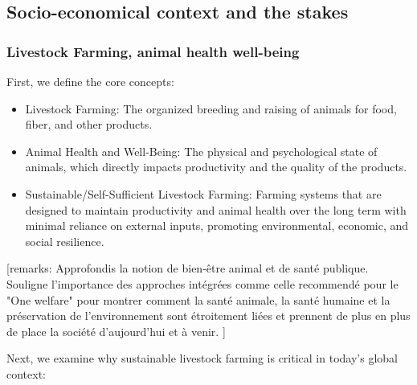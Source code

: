 \subsection{Socio-economical context and the stakes}




\subsubsection{Livestock Farming, animal health well-being}



First, we define the core concepts:
\begin{itemize}
    \item Livestock Farming: The organized breeding and raising of animals for food, fiber, and other products.
    \item Animal Health and Well-Being: The physical and psychological state of animals, which directly impacts productivity and the quality of the products.
    \item Sustainable/Self-Sufficient Livestock Farming: Farming systems that are designed to maintain productivity and animal health over the long term with minimal reliance on external inputs, promoting environmental, economic, and social resilience.
\end{itemize}

[remarks: Approfondis la notion de bien-être animal et de santé publique.
Souligne l’importance des approches intégrées comme celle recommendé pour le "One welfare" pour montrer comment la santé animale, la santé humaine et la préservation de l’environnement sont étroitement liées et prennent de plus en plus de place la société d'aujourd'hui et à venir. ]

Next, we examine why sustainable livestock farming is critical in today’s global context:

